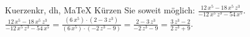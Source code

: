 \begin{MAufgabe}{Kuerzen}{kr, dh, MaTeX}
K\"urzen Sie soweit m\"oglich: $\frac{12\, x^5 - 18\, x^5\, z^3}{ - 12\, x^5\, z^3 - 54\, x^5}$.\\ 
\ifLsg\MLoesung
\quad $\frac{12\, x^5 - 18\, x^5\, z^3}{ - 12\, x^5\, z^3 - 54\, x^5}=\frac{(6\, x^5)\cdot(2 - 3\, z^3)}{(6\, x^5)\cdot( - 2\, z^3 - 9)}=\frac{2 - 3\, z^3}{ - 2\, z^3 - 9}=\frac{3\, z^3 - 2}{2\, z^3 + 9}$.\else\relax\fi
 \end{MAufgabe}